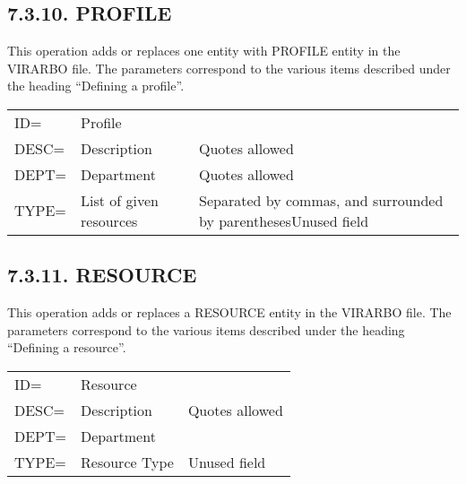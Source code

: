 \documentclass[letterpaper,10pt,english]{sphinxmanual}
\begin{document}
\subsection{7.3.10. PROFILE}
\label{\detokenize{Installation_Guide:profile}}
This operation adds or replaces one entity with PROFILE entity in the VIRARBO file. The parameters correspond to the various items described under the heading “Defining a profile”.


\begin{savenotes}\sphinxattablestart
\centering
\begin{tabulary}{\linewidth}[t]{|T|T|T|}
\hline
{}\relax &\relax &\relax \\
\hline
ID=
&
Profile
&\\
\hline
DESC=
&
Description
&
Quotes allowed
\\
\hline
DEPT=
&
Department
&
Quotes allowed
\\
\hline
TYPE=
&
List of given resources
&
Separated by commas, and surrounded by parenthesesUnused field
\\
\hline
\end{tabulary}
\par
\sphinxattableend\end{savenotes}


\subsection{7.3.11. RESOURCE}
\label{\detokenize{Installation_Guide:resource}}
This operation adds or replaces a RESOURCE entity in the VIRARBO file. The parameters correspond to the various items described under the heading “Defining a resource”.


\begin{savenotes}\sphinxattablestart
\centering
\begin{tabulary}{\linewidth}[t]{|T|T|T|}
\hline
{}\relax &\relax &\relax \\
\hline
ID=
&
Resource
&\\
\hline
DESC=
&
Description
&
Quotes allowed
\\
\hline
DEPT=
&
Department
&\\
\hline
TYPE=
&
Resource Type
&
Unused field
\\
\hline
\end{tabulary}
\par
\sphinxattableend\end{savenotes}
\end{document}
